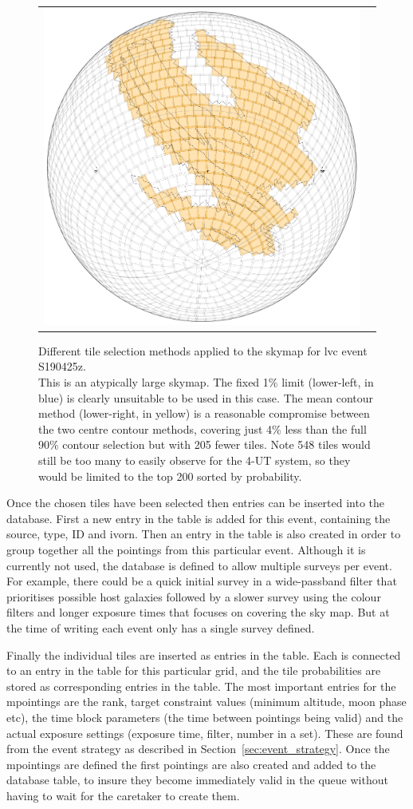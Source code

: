 \begin{colsection}
\begin{colsection}
\begin{figure}[p]
\begin{center}
\begin{tabular}{cc}
\includegraphics[width=0.25\linewidth]{images/tiling/3_b.png}
\\

\end{tabular}
\end{center}
\caption[Different tile selection methods for S190425z]{Different tile selection methods applied to the skymap for \gls{lvc} event S190425z.\\
This is an atypically large skymap. The fixed 1\% limit (lower-left, in blue) is clearly unsuitable to be used in this case. The mean contour method (lower-right, in yellow) is a reasonable compromise between the two centre contour methods, covering just 4\% less than the full 90\% contour selection but with 205 fewer tiles. Note 548 tiles would still be too many to easily observe for the 4-UT system, so they would be limited to the top 200 sorted by probability.
}
\label{fig:tiling_S190425z}
\end{figure}


\clearpage

Once the chosen tiles have been selected then entries can be inserted into the database. First a new entry in the  table is added for this event, containing the source, type, ID and \gls{ivorn}. Then an entry in the  table is also created in order to group together all the pointings from this particular event. Although it is currently not used, the database is defined to allow multiple surveys per event. For example, there could be a quick initial survey in a wide-passband filter that prioritises possible host galaxies followed by a slower survey using the colour filters and longer exposure times that focuses on covering the sky map. But at the time of writing each event only has a single survey defined.

Finally the individual tiles are inserted as entries in the  table. Each is connected to an entry in the  table for this particular grid, and the tile probabilities are stored as corresponding entries in the  table. The most important entries for the mpointings are the rank, target constraint values (minimum altitude, moon phase etc), the time block parameters (the time between pointings being valid) and the actual exposure settings (exposure time, filter, number in a set). These are found from the event strategy as described in Section~\ref{sec:event_strategy}. Once the mpointings are defined the first pointings are also created and added to the database  table, to insure they become immediately valid in the queue without having to wait for the caretaker to create them.


\end{colsection}
\end{colsection}
